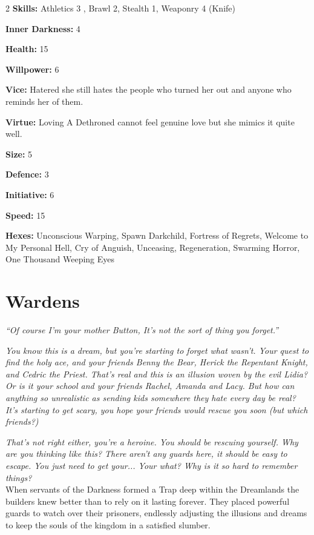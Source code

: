 \begin{multicols}{2}
\noindent \textbf{Skills:} Athletics 3 , Brawl 2, Stealth 1, Weaponry 4 (Knife)

\noindent \textbf{Inner Darkness:} 4

\noindent \textbf{Health:} 15

\noindent \textbf{Willpower:} 6

\noindent \textbf{Vice:} Hatered \textendash she still hates the people who turned her out and anyone who reminds her of them.

\noindent \textbf{Virtue:} Loving \textendash A Dethroned cannot feel genuine love but she mimics it quite well.

\noindent \textbf{Size:} 5

\noindent \textbf{Defence:} 3

\noindent \textbf{Initiative:} 6

\noindent \textbf{Speed:} 15

\noindent \textbf{Hexes:} Unconscious Warping, Spawn Darkchild, Fortress of Regrets, Welcome to My Personal Hell, Cry of Anguish, Unceasing, Regeneration, Swarming Horror, One Thousand Weeping Eyes

\section*{Wardens}
\label{sec:Wardens}

\textit{\textquotedblleft Of course I'm your mother Button, It's not the sort of thing you forget.\textquotedblright}

\textit{You know this is a dream, but you're starting to forget what wasn't. Your quest to find the holy ace, and your friends Benny the Bear, Herick the Repentant Knight, and Cedric the Priest. That's real and this is an illusion woven by the evil Lidia? Or is it your school and your friends Rachel, Amanda and Lacy. But how can anything so unrealistic as sending kids somewhere they hate every day be real? It's starting to get scary, you hope your friends would rescue you soon (but which friends?)}

\textit{That's not right either, you're a heroine. You should be rescuing yourself. Why are you thinking like this? There aren't any guards here, it should be easy to escape. You just need to get your... Your what? Why is it so hard to remember things?}\\

\noindent When servants of the Darkness formed a Trap deep within the Dreamlands the builders knew better than to rely on it lasting forever. They placed powerful guards to watch over their prisoners, endlessly adjusting the illusions and dreams to keep the souls of the kingdom in a satisfied slumber.


\end{multicols}
